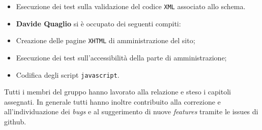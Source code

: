 \begin{itemize}
\begin{itemize}
		\item Esecuzione dei test sulla validazione del codice \texttt{XML} associato allo schema.
	\end{itemize}
	\begin{itemize}
	\item \textbf{Davide Quaglio} si è occupato dei seguenti compiti:
		\item Creazione delle pagine \texttt{XHTML} di amministrazione del sito;
		\item Esecuzione dei test sull'accessibilità della parte di amministrazione;
		\item Codifica degli script \texttt{javascript}.
	\end{itemize}
\end{itemize}

Tutti i membri del gruppo hanno lavorato alla relazione e steso i capitoli assegnati. In generale tutti hanno inoltre contribuito alla correzione e all'individuazione dei \textit{bugs} e al suggerimento di nuove \textit{features} tramite le issues di github.